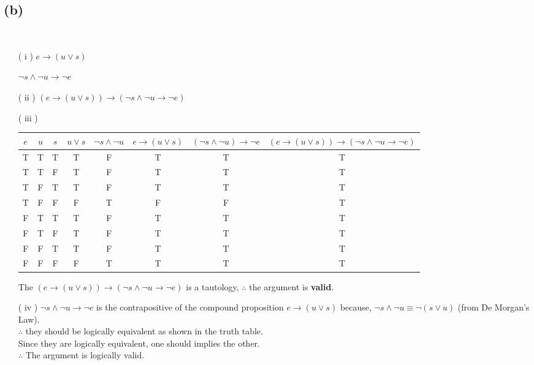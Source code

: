 \documentclass[a4paper,12pt]{article}
\begin{document}
\subsection{(b)}
\,
\begin{itemize}
    \item[( i )] $e \rightarrow (u \lor s)$
    \item[] $\neg s \land \neg u \rightarrow \neg e$
    \item[( ii )] $(e \rightarrow (u \lor s)) \rightarrow (\neg s \land \neg u \rightarrow \neg e)$ 
    \item[( iii )]
    \item[]
        \begin{tabular}{ccc|c|c|c|c|c}
            $e$ & $u$ & $s$ & $u \lor s$ & $\neg s \land \neg u$ & $e \rightarrow ( u \lor s)$ & $(\neg s \land \neg u) \rightarrow \neg e$ & $(e \rightarrow (u \lor s)) \rightarrow (\neg s \land \neg u \rightarrow \neg e)$\\
            \hline
            T & T & T & T & F & T & T & T\\
            T & T & F & T & F & T & T & T\\
            T & F & T & T & F & T & T & T\\
            T & F & F & F & T & F & F & T\\
            F & T & T & T & F & T & T & T\\
            F & T & F & T & F & T & T & T\\
            F & F & T & T & F & T & T & T\\
            F & F & F & F & T & T & T & T\\
        \end{tabular}
    \item[]The $(e \rightarrow (u \lor s)) \rightarrow (\neg s \land \neg u \rightarrow \neg e)$ is a tautology, $\therefore$ the argument is \textbf{valid}.\\
    \item[( iv )] $\neg s \land \neg u \rightarrow \neg e$ is the contrapositive of the compound proposition $e \rightarrow (u \lor s)$ because, $\neg s \land \neg u \equiv \neg(s \lor u)$ (from De Morgan's Law). \\$\therefore$ they should be logically equivalent as shown in the truth table. \\Since they are logically equivalent, one should implies the other. \\$\therefore$ The argument is logically valid.
\end{itemize}
\end{document}
